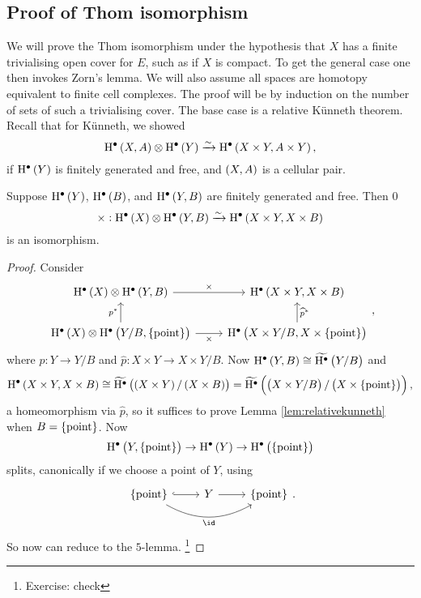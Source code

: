 \pagebreak

\subsection{Proof of Thom isomorphism}


We will prove the Thom isomorphism under the hypothesis that $ X $ has a finite trivialising open cover for $ E $, such as if $ X $ is compact. To get the general case one then invokes Zorn's lemma. We will also assume all spaces are homotopy equivalent to finite cell complexes. The proof will be by induction on the number of sets of such a trivialising cover. The base case is a relative K\"unneth theorem. Recall that for K\"unneth, we showed
$$ \H^\bullet\br{X, A} \otimes \H^\bullet\br{Y} \xrightarrow{\sim} \H^\bullet\br{X \times Y, A \times Y}, $$
if $ \H^\bullet\br{Y} $ is finitely generated and free, and $ \br{X, A} $ is a cellular pair.

\begin{lemma}
\label{lem:relativekunneth}
Suppose $ \H^\bullet\br{Y} $, $ \H^\bullet\br{B} $, and $ \H^\bullet\br{Y, B} $ are finitely generated and free. Then
0$$ \times : \H^\bullet\br{X} \otimes \H^\bullet\br{Y, B} \xrightarrow{\sim} \H^\bullet\br{X \times Y, X \times B} $$
is an isomorphism.
\end{lemma}

\begin{proof}
Consider
$$
\begin{tikzcd}
\H^\bullet\br{X} \otimes \H^\bullet\br{Y, B} \arrow{r}{\times} & \H^\bullet\br{X \times Y, X \times B} \\
\H^\bullet\br{X} \otimes \H^\bullet\br{Y / B, \pt} \arrow{u}{p^*} \arrow{r}[swap]{\times} & \H^\bullet\br{X \times Y / B, X \times \pt} \arrow{u}[swap]{\widehat{p}^*}
\end{tikzcd},
$$
where $ p : Y \to Y / B $ and $ \widehat{p} : X \times Y \to X \times Y / B $. Now $ \H^\bullet\br{Y, B} \cong \widetilde{\H^\bullet}\br{Y / B} $ and
$$ \H^\bullet\br{X \times Y, X \times B} \cong \widetilde{\H^\bullet}\br{\br{X \times Y} / \br{X \times B}} = \widetilde{\H^\bullet}\br{\br{X \times Y / B} / \br{X \times \pt}}, $$
a homeomorphism via $ \widehat{p} $, so it suffices to prove Lemma \ref{lem:relativekunneth} when $ B = \pt $. Now
$$ \H^\bullet\br{Y, \pt} \to \H^\bullet\br{Y} \to \H^\bullet\br{\pt} $$
splits, canonically if we choose a point of $ Y $, using
$$
\begin{tikzcd}
\pt \arrow[hookrightarrow]{r} \arrow[bend right=30]{rr}[swap]{\id} & Y \arrow{r} & \pt
\end{tikzcd}.
$$
So now can reduce to the $ 5 $-lemma. \footnote{Exercise: check}
\end{proof}

